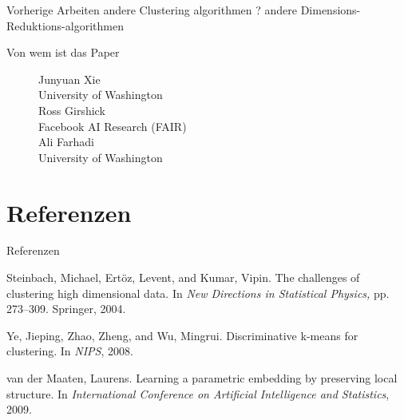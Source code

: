 \documentclass{beamer}
\begin{document}
\begin{frame}[t]{Vorherige Arbeiten}\vspace{4pt}
andere Clustering algorithmen ?
andere Dimensions-Reduktions-algorithmen
\end{frame}

\begin{frame}[t]{Von wem ist das Paper}\vspace{30pt}

\begin{figure}
\center
\Large{Junyuan Xie}\\
University of Washington\\
\vspace{8pt}
\Large{Ross Girshick}\\
Facebook AI Research (FAIR)\\
\vspace{8pt}
\Large{Ali Farhadi}\\
University of Washington\\
\end{figure}

\end{frame}


\section{Referenzen}
\begin{frame}[t]{Referenzen}\vspace{4pt}
\begin{thebibliography}{10}
Steinbach, Michael, Ertöz, Levent, and Kumar, Vipin.
The challenges of clustering high dimensional data. In
\textit{New Directions in Statistical Physics,} pp. 273–309. Springer, 2004.

Ye, Jieping, Zhao, Zheng, and Wu, Mingrui. Discriminative k-means for clustering. In \textit{NIPS}, 2008.

van der Maaten, Laurens. Learning a parametric embedding by preserving local structure. In \textit{International Conference on Artificial Intelligence and Statistics}, 2009.
\end{thebibliography}
\end{frame}
\end{document}
